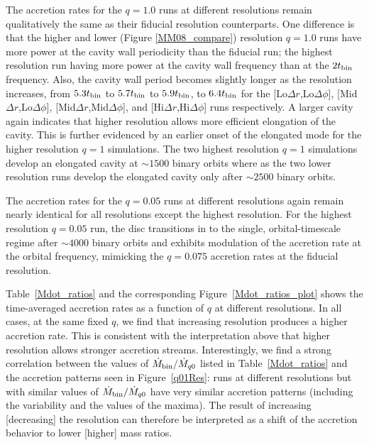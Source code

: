 The accretion rates for the $q=1.0$ runs at different resolutions remain qualitatively the same as their fiducial resolution counterparts. One difference is that the higher and lower (Figure \ref{MM08_compare}) resolution $q=1.0$ runs have more power at the cavity wall periodicity than the fiducial run; the highest resolution run having more power at the cavity wall frequency than at the $2 t_{\rm bin}$ frequency. 
Also, the cavity wall period becomes slightly longer as the resolution increases, from $5.3 t_{\rm bin}$ to $5.7 t_{\rm bin}$ to $5.9 t_{\rm bin}$, to $6.4 t_{\rm bin}$ for the  [Lo$\Delta r$,Lo$\Delta \phi$],  [Mid$\Delta r$,Lo$\Delta \phi$], [Mid$\Delta r$,Mid$\Delta \phi$], and [Hi$\Delta r$,Hi$\Delta \phi$]  runs respectively. A larger cavity again indicates that higher resolution allows more efficient elongation of the cavity. 
This is further evidenced by an earlier onset of the elongated mode for the higher resolution $q=1$ simulations. The two highest resolution $q=1$ simulations develop an elongated cavity at $\sim 1500$ binary orbits where as the two lower resolution runs develop the elongated cavity only after $\sim 2500$ binary orbits.


The accretion rates for the $q=0.05$ runs at different resolutions again remain nearly identical for all resolutions except the highest resolution. For the highest resolution $q=0.05$ run, the disc transitions in to the single, orbital-timescale regime after $\sim 4000$ binary orbits and exhibits modulation of the accretion rate at the orbital frequency, mimicking the $q=0.075$ accretion rates at the fiducial resolution.




Table~\ref{Mdot_ratios} and the corresponding
Figure~\ref{Mdot_ratios_plot} shows the time-averaged accretion rates
as a function of $q$ at different resolutions.  In all cases, at the
same fixed $q$, we find that increasing resolution produces a higher
accretion rate.  This is consistent with the interpretation above that
higher resolution allows stronger accretion streams.  Interestingly,
we find a strong correlation between the values of $\dot{M}_{\rm
  bin}/\dot{M}_{q0}$ listed in Table~\ref{Mdot_ratios} and the
accretion patterns seen in Figure~\ref{q01Res}: runs at different
resolutions but with similar values of $\dot{M}_{\rm bin}/\dot{M}_{q0}$ 
have very similar accretion patterns (including
the variability and the values of the maxima).  The result of
increasing [decreasing] the resolution can therefore be interpreted as
a shift of the accretion behavior to lower [higher] mass ratios.


